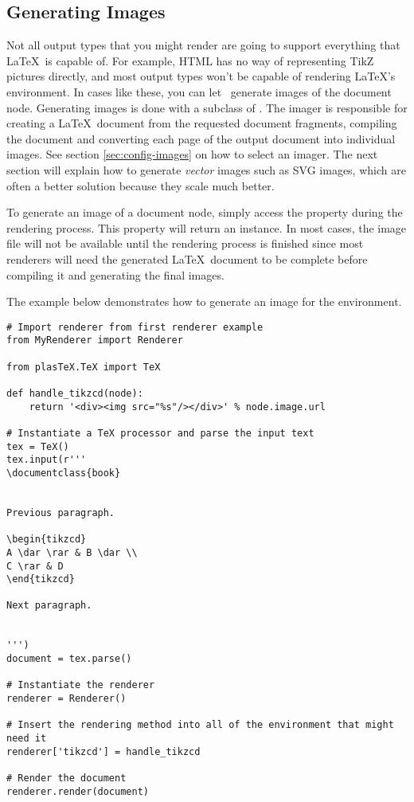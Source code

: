 \subsection{Generating Images}

Not all output types that you might render are going to support everything
that \LaTeX\ is capable of.  For example, HTML has no way of representing
TikZ pictures directly, and most output types won't be capable of rendering
\LaTeX's  environment.  In cases like these, you
can let \plasTeX\ generate images of the document node.  Generating
images is done with a subclass of .
The imager is responsible for creating a \LaTeX\ document from the
requested document fragments, compiling the document and converting
each page of the output document into individual images.
See section \ref{sec:config-images} on how to select an imager.
The next section will explain how to generate \emph{vector} images such
as SVG images, which are often a better solution because they scale much better.

To generate an image of a document node, simply access the 
property during the rendering process.  This property will return
an  instance.  In most cases, the image
file will not be available until the rendering process is finished
since most renderers will need the generated \LaTeX\ document to be
complete before compiling it and generating the final images.

The example below demonstrates how to generate an image for the
 environment.
\begin{verbatim}
# Import renderer from first renderer example
from MyRenderer import Renderer

from plasTeX.TeX import TeX

def handle_tikzcd(node):
    return '<div><img src="%s"/></div>' % node.image.url

# Instantiate a TeX processor and parse the input text
tex = TeX()
tex.input(r'''
\documentclass{book}


Previous paragraph.

\begin{tikzcd}
A \dar \rar & B \dar \\
C \rar & D
\end{tikzcd}

Next paragraph.


''')
document = tex.parse()

# Instantiate the renderer
renderer = Renderer()

# Insert the rendering method into all of the environment that might need it
renderer['tikzcd'] = handle_tikzcd

# Render the document
renderer.render(document)
\end{verbatim}

